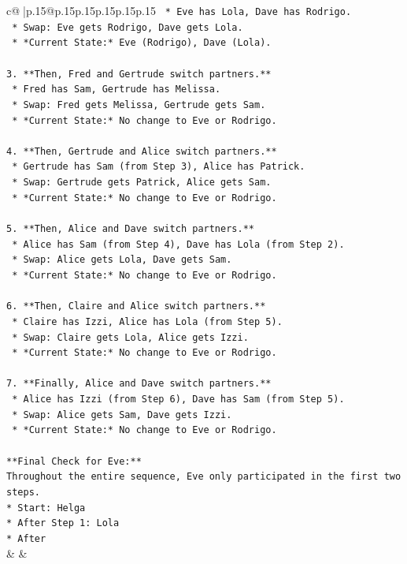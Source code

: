 \documentclass{article}
\begin{document}
{\begin{supertabular}{c@{$\;$}|p{.15\linewidth}@{}p{.15\linewidth}p{.15\linewidth}p{.15\linewidth}p{.15\linewidth}p{.15\linewidth}}
{{{\texttt{    *   Eve has Lola, Dave has Rodrigo.} \\
\texttt{    *   Swap: Eve gets Rodrigo, Dave gets Lola.} \\
\texttt{    *   *Current State:* Eve (Rodrigo), Dave (Lola).} \\
\\ 
\texttt{3.  **Then, Fred and Gertrude switch partners.**} \\
\texttt{    *   Fred has Sam, Gertrude has Melissa.} \\
\texttt{    *   Swap: Fred gets Melissa, Gertrude gets Sam.} \\
\texttt{    *   *Current State:* No change to Eve or Rodrigo.} \\
\\ 
\texttt{4.  **Then, Gertrude and Alice switch partners.**} \\
\texttt{    *   Gertrude has Sam (from Step 3), Alice has Patrick.} \\
\texttt{    *   Swap: Gertrude gets Patrick, Alice gets Sam.} \\
\texttt{    *   *Current State:* No change to Eve or Rodrigo.} \\
\\ 
\texttt{5.  **Then, Alice and Dave switch partners.**} \\
\texttt{    *   Alice has Sam (from Step 4), Dave has Lola (from Step 2).} \\
\texttt{    *   Swap: Alice gets Lola, Dave gets Sam.} \\
\texttt{    *   *Current State:* No change to Eve or Rodrigo.} \\
\\ 
\texttt{6.  **Then, Claire and Alice switch partners.**} \\
\texttt{    *   Claire has Izzi, Alice has Lola (from Step 5).} \\
\texttt{    *   Swap: Claire gets Lola, Alice gets Izzi.} \\
\texttt{    *   *Current State:* No change to Eve or Rodrigo.} \\
\\ 
\texttt{7.  **Finally, Alice and Dave switch partners.**} \\
\texttt{    *   Alice has Izzi (from Step 6), Dave has Sam (from Step 5).} \\
\texttt{    *   Swap: Alice gets Sam, Dave gets Izzi.} \\
\texttt{    *   *Current State:* No change to Eve or Rodrigo.} \\
\\ 
\texttt{**Final Check for Eve:**} \\
\texttt{Throughout the entire sequence, Eve only participated in the first two steps.} \\
\texttt{*   Start: Helga} \\
\texttt{*   After Step 1: Lola} \\
\texttt{*   After} \\
            }
        }
    }
    & & \\ \\


\end{supertabular}}
\end{document}
